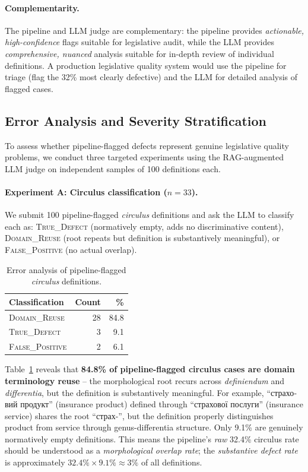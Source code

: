 \documentclass[11pt]{article}
\begin{document}
\paragraph{Complementarity.}
The pipeline and LLM judge are complementary: the pipeline provides \emph{actionable, high-confidence} flags suitable for legislative audit, while the LLM provides \emph{comprehensive, nuanced} analysis suitable for in-depth review of individual definitions.
A production legislative quality system would use the pipeline for triage (flag the 32\% most clearly defective) and the LLM for detailed analysis of flagged cases.

\subsection{Error Analysis and Severity Stratification}
\label{sec:error-analysis}

To assess whether pipeline-flagged defects represent genuine legislative quality problems, we conduct three targeted experiments using the RAG-augmented LLM judge on independent samples of 100 definitions each.

\paragraph{Experiment A: Circulus classification ($n=33$).}
We submit 100 pipeline-flagged \emph{circulus} definitions and ask the LLM to classify each as: \textsc{True\_Defect} (normatively empty, adds no discriminative content), \textsc{Domain\_Reuse} (root repeats but definition is substantively meaningful), or \textsc{False\_Positive} (no actual overlap).

\begin{table}[t]
\centering
\caption{Error analysis of pipeline-flagged \emph{circulus} definitions.}
\label{tab:error-circulus}
\begin{tabular}{lrr}
\toprule
\textbf{Classification} & \textbf{Count} & \textbf{\%} \\
\midrule
\textsc{Domain\_Reuse} & 28 & 84.8 \\
\textsc{True\_Defect} & 3 & 9.1 \\
\textsc{False\_Positive} & 2 & 6.1 \\
\bottomrule
\end{tabular}
\end{table}

Table~\ref{tab:error-circulus} reveals that \textbf{84.8\% of pipeline-flagged circulus cases are domain terminology reuse} -- the morphological root recurs across \emph{definiendum} and \emph{differentia}, but the definition is substantively meaningful.
For example, \foreignlanguage{ukrainian}{``страховий продукт''} (insurance product) defined through \foreignlanguage{ukrainian}{``страхової послуги''} (insurance service) shares the root \foreignlanguage{ukrainian}{``страх-''}, but the definition properly distinguishes product from service through genus-differentia structure.
Only 9.1\% are genuinely normatively empty definitions.
This means the pipeline's \emph{raw} 32.4\% circulus rate should be understood as a \emph{morphological overlap rate}; the \emph{substantive defect rate} is approximately $32.4\% \times 9.1\% \approx 3\%$ of all definitions.
\end{document}
